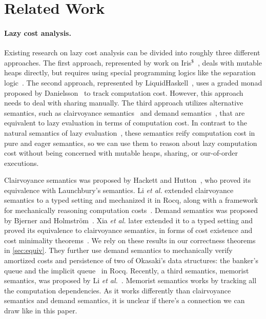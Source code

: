 \section{Related Work}\label{sec:related-work}


\paragraph{Lazy cost analysis.}
Existing research on lazy cost analysis can be divided into roughly three
different approaches. The first approach, represented by work on
Iris$^{\$}$~\cite{iris-credit,iris-thunk}, deals with mutable heaps directly,
but requires using special programming logics like the separation
logic~\cite{separation-logic}. The second approach, represented by
LiquidHaskell~\cite{liquidate,liquid-okasaki}, uses a graded monad proposed by
Danielsson~\cite{danielsson-08} to track computation cost. However, this
approach needs to deal with sharing manually. The third approach utilizes
alternative semantics, such as clairvoyance
semantics~\cite{clairvoyant,forking-paths} and demand
semantics~\cite{bjerner1989,demand-semantics}, that are equivalent to lazy
evaluation in terms of computation cost. In contrast to the natural semantics of
lazy evaluation~\cite{launchbury1993}, these semantics reify computation cost in
pure and eager semantics, so we can use them to reason about lazy computation
cost without being concerned with mutable heaps, sharing, or our-of-order
executions.

Clairvoyance semantics was proposed by Hackett and Hutton~\cite{clairvoyant},
who proved its equivalence with Launchbury's semantics. Li \emph{et al.}
extended clairvoyance semantics to a typed setting and mechanized it in Rocq,
along with a framework for mechanically reasoning computation
costs~\cite{forking-paths}. Demand semantics was proposed by Bjerner and
Holmstr{\"{o}}m~\cite{bjerner1989}. Xia \emph{et al.} later extended it to a
typed setting and proved its equivalence to clairvoyance semantics, in forms of
cost existence and cost minimality theorems~\cite{demand-semantics}. We rely on
these results in our correctness theorems in \cref{sec:equiv}. They further use
demand semantics to mechanically verify amortized costs and persistence of two
of Okasaki's data structures: the banker's queue and the implicit
queue~\cite{purely-functional} in Rocq. Recently, a third semantics, memorist
semantics, was proposed by Li \emph{et al.}~\cite{memorist}. Memorist semantics
works by tracking all the computation dependencies. As it works differently than
clairvoyance semantics and demand semantics, it is unclear if there's a
connection we can draw like in this paper.

